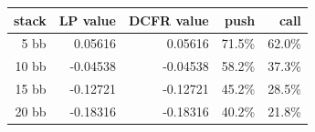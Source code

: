 \begin{tabular}{rrrrr}
\toprule
stack & LP value & DCFR value & push & call \\ \midrule
5 bb & 0.05616 & 0.05616 & 71.5\% & 62.0\% \\
10 bb & -0.04538 & -0.04538 & 58.2\% & 37.3\% \\
15 bb & -0.12721 & -0.12721 & 45.2\% & 28.5\% \\
20 bb & -0.18316 & -0.18316 & 40.2\% & 21.8\% \\
\bottomrule
\end{tabular}
